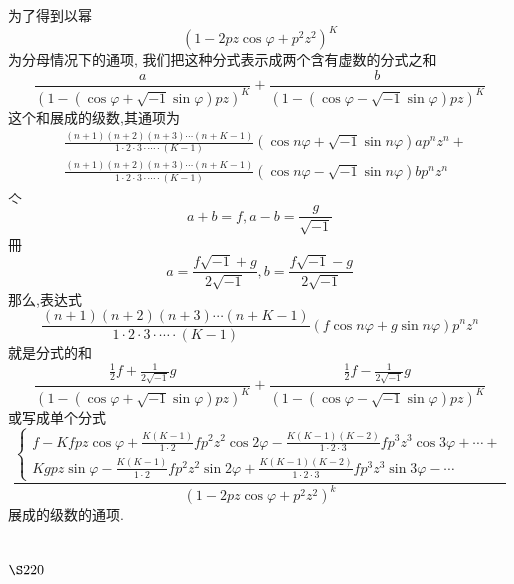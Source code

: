 为了得到以幂
\[
\left(1-2 p z \cos \varphi+p^{2} z^{2}\right)^{K}
\]
为分母情况下的通项, 我们把这种分式表示成两个含有虚数的分式之和
\[
\frac{a}{(1-(\cos \varphi+\sqrt{-1} \sin \varphi) p z)^{K}}+\frac{b}{(1-(\cos \varphi-\sqrt{-1} \sin \varphi) p z)^{K}}
\]
这个和展成的级数,其通项为
\[
\begin{aligned}
& \frac{(n+1)(n+2)(n+3) \cdots(n+K-1)}{1 \cdot 2 \cdot 3 \cdot \cdots \cdot(K-1)}(\cos n \varphi+\sqrt{-1} \sin n \varphi) a p^{n} z^{n}+ \\
& \frac{(n+1)(n+2)(n+3) \cdots(n+K-1)}{1 \cdot 2 \cdot 3 \cdot \cdots \cdot(K-1)}(\cos n \varphi-\sqrt{-1} \sin n \varphi) b p^{n} z^{n}
\end{aligned}
\]
$\hat{亽}$
\[
a+b=f, a-b=\frac{g}{\sqrt{-1}}
\]
冊
\[
a=\frac{f \sqrt{-1}+g}{2 \sqrt{-1}}, b=\frac{f \sqrt{-1}-g}{2 \sqrt{-1}}
\]
那么,表达式
\[
\frac{(n+1)(n+2)(n+3) \cdots(n+K-1)}{1 \cdot 2 \cdot 3 \cdot \cdots \cdot(K-1)}(f \cos n \varphi+g \sin n \varphi) p^{n} z^{n}
\]
就是分式的和
\[
\frac{\frac{1}{2} f+\frac{1}{2 \sqrt{-1}} g}{(1-(\cos \varphi+\sqrt{-1} \sin \varphi) p z)^{K}}+\frac{\frac{1}{2} f-\frac{1}{2 \sqrt{-1}} g}{(1-(\cos \varphi-\sqrt{-1} \sin \varphi) p z)^{K}}
\]
或写成单个分式
\[
\frac{\left\{\begin{array}{l}
f-K f p z \cos \varphi+\frac{K(K-1)}{1 \cdot 2} f p^{2} z^{2} \cos 2 \varphi-\frac{K(K-1)(K-2)}{1 \cdot 2 \cdot 3} f p^{3} z^{3} \cos 3 \varphi+\cdots+ \\
K g p z \sin \varphi-\frac{K(K-1)}{1 \cdot 2} f p^{2} z^{2} \sin 2 \varphi+\frac{K(K-1)(K-2)}{1 \cdot 2 \cdot 3} f p^{3} z^{3} \sin 3 \varphi-\cdots
\end{array}\right.}{\left(1-2 p z \cos \varphi+p^{2} z^{2}\right)^{k}}
\]
展成的级数的通项. 

\section{$\S 220$}


